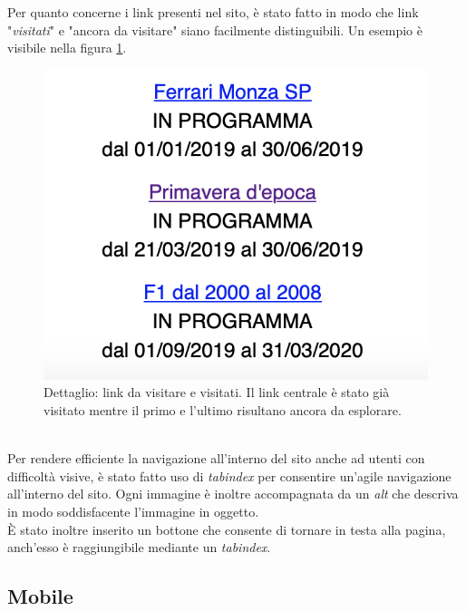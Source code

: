 Per quanto concerne i link presenti nel sito, è stato fatto in modo che link "\textit{visitati}" e "ancora da visitare" siano facilmente distinguibili. Un esempio è visibile nella figura \ref{fig:linkVisitatiDaVisitare}.
\begin{figure}[h]
	\begin{center}
		\includegraphics[scale=0.3]{Images/linkVisitatiDaVisitare.png}
		\caption{Dettaglio: link da visitare e visitati. Il link centrale è stato già visitato mentre il primo e l'ultimo risultano ancora da esplorare.}
		\label{fig:linkVisitatiDaVisitare}
	\end{center}
\end{figure}\\
Per rendere efficiente la navigazione all'interno del sito anche ad utenti con difficoltà visive, è stato fatto uso di \textit{tabindex} per consentire un'agile navigazione all'interno del sito. Ogni immagine è inoltre accompagnata da un \textit{alt} che descriva in modo soddisfacente l'immagine in oggetto.\\
È stato inoltre inserito un bottone che consente di tornare in testa alla pagina, anch'esso è raggiungibile mediante un \textit{tabindex}.

\subsection{Mobile}